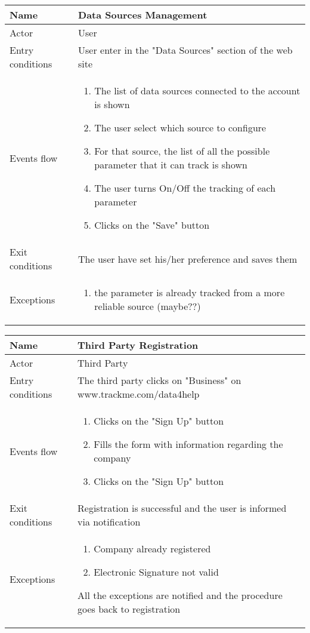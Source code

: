\newpage
\begin{table}[h!]
\begin{tabular}{|l|p{12cm}|}
\hline
Name             & Data Sources Management \\ \hline
Actor            & User \\ \hline
Entry conditions & User enter in the "Data Sources" section of the web site \\ \hline
Events flow      & \begin{enumerate}
\item The list of data sources connected to the account is shown
\item The user select which source to configure
\item For that source, the list of all the possible parameter that it can track is shown
\item The user turns On/Off the tracking of each parameter
\item Clicks on the "Save" button
\end{enumerate} \\ \hline
Exit conditions  & The user have set his/her preference and saves them \\ \hline
Exceptions       & \begin{enumerate}
\item the parameter is already tracked from a more reliable source (maybe??)
\end{enumerate} \\ \hline
\end{tabular}
\end{table}

\begin{table}[h!]
\begin{tabular}{|l|p{12cm}|}
\hline
Name             & Third Party Registration \\ \hline
Actor            & Third Party \\ \hline
Entry conditions & The third party clicks on "Business" on www.trackme.com/data4help \\ \hline
Events flow      & \begin{enumerate}
\item Clicks on the "Sign Up" button
\item Fills the form with information regarding the company
\item Clicks on the "Sign Up" button
\end{enumerate} \\ \hline
Exit conditions  & Registration is successful and the user is informed via notification \\ \hline
Exceptions       & \begin{enumerate}
\item Company already registered
\item Electronic Signature not valid
\end{enumerate} All the exceptions are notified and the procedure goes back to registration \\ \hline
\end{tabular}
\end{table}

